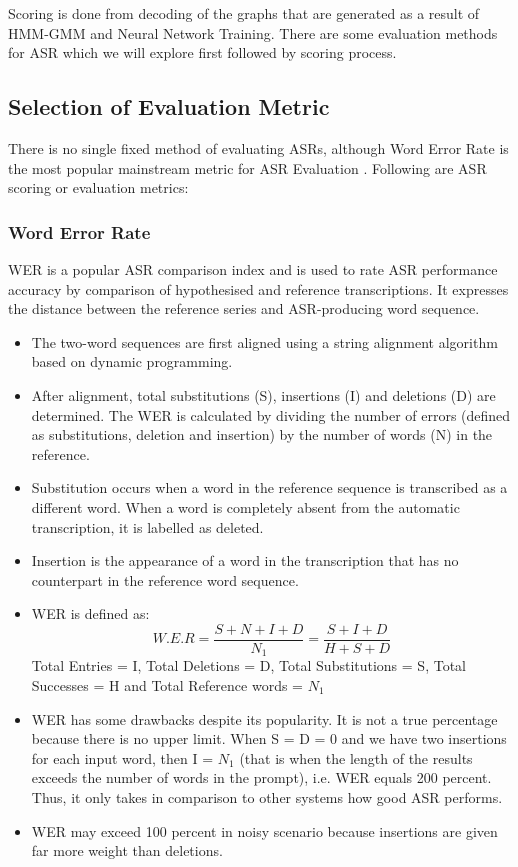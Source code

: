 Scoring is done from decoding of the graphs that are generated as a result of HMM-GMM and Neural Network Training. There are some evaluation methods for ASR which we will explore first followed by scoring process.

\subsection{Selection of Evaluation Metric}
There is no single fixed method of evaluating ASRs, although Word Error Rate is the most popular mainstream metric for ASR Evaluation \cite{maglogiannis__2020}. Following are ASR scoring or evaluation metrics:

\subsubsection{Word Error Rate} 
WER is a popular ASR comparison index and is used to rate ASR performance accuracy by comparison of hypothesised and reference transcriptions. It expresses the distance between the reference series and ASR-producing word sequence.   
    \begin{itemize}
        \item The two-word sequences are first aligned using a string alignment algorithm based on dynamic programming. 
        \item After alignment, total substitutions (S), insertions (I) and deletions (D) are determined. The WER is calculated by dividing the number of errors (defined as substitutions, deletion and insertion) by the number of words (N) in the reference. 
        \item Substitution occurs when a word in the reference sequence is transcribed as a different word. When a word is completely absent from the automatic transcription, it is labelled as deleted. 
        \item Insertion is the appearance of a word in the transcription that has no counterpart in the reference word sequence. 
        \item WER is defined \cite{morris_wer_2004} as:
            \begin{equation}
                W.E.R = \frac{S+N+I+D}{N_{1}} =\frac{S+I+D}{H+S+D}   
            \end{equation}
            Total Entries = I, Total Deletions = D, Total Substitutions = S, Total Successes = H and Total Reference words = $N_{1}$
        \item WER has some drawbacks despite its popularity. It is not a true percentage because there is no upper limit. When S = D = 0 and we have two insertions for each input word, then I = $N_{1}$ (that is when the length of the results exceeds the number of words in the prompt), i.e. WER equals 200 percent. Thus, it only takes in comparison to other systems how good ASR performs. 
        \item WER may exceed 100 percent in noisy scenario because insertions are given far more weight than deletions.
    \end{itemize}

